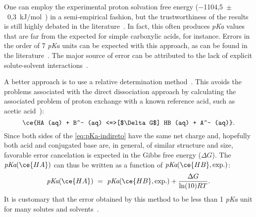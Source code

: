 One can employ the experimental proton solvation free energy
($-$1104,5~$\pm$~0,3~kJ/mol~\cite{Tissandier_1998,Marenich_2009}) in a
semi-empirical fashion, but the trustworthiness of the results is still highly
debated in the literature~\cite{Yang_2013}.
In fact, this often produces \emph{pKa} values that are far from the expected
for simple carboxylic acids, for instance.
Errors in the order of 7 \emph{pKa} units can be expected with this approach,
as can be found in the literature~\cite{Pliego_2002,Ding_2009}.
The major source of error can be attributed to the lack of explicit
solute-solvent interactions~\cite{Pliego_2002}.

A better approach is to use a relative determination method~\cite{Ding_2009}.
This avoids the problems associated with the direct dissociation approach
by calculating the associated problem of proton exchange with a known reference
acid, such as acetic acid~\cite{Goldberg_2002}):
%
\begin{equation}
  \ce{HA (aq) + B^- (aq) <=>[$\Delta G$] HB (aq) + A^- (aq)}\text{.}
  \label{eq:pKa-indireto}
\end{equation}
%
Since both sides of the \autoref{eq:pKa-indireto}
have the same net charge and, hopefully both acid and conjugated base are, in
general, of similar structure and size, favorable error cancelation is expected
in the Gibbs free energy ($\Delta G$).
The $\emph{pKa}(\ce{HA})$
can thus be written as a function of $\emph{pKa}(\ce{HB}, \text{exp.})$:
%
\begin{equation}
  \emph{pKa}(\ce{HA})~=~\emph{pKa}(\ce{HB}, \text{exp.}) + \frac{\Delta G}{\ln(10) R T}\text{.}
\end{equation}
%
It is customary that the error obtained by this method to be less than 1 \emph{pKa}
unit for many solutes and solvents~\cite{Ding_2009}.
